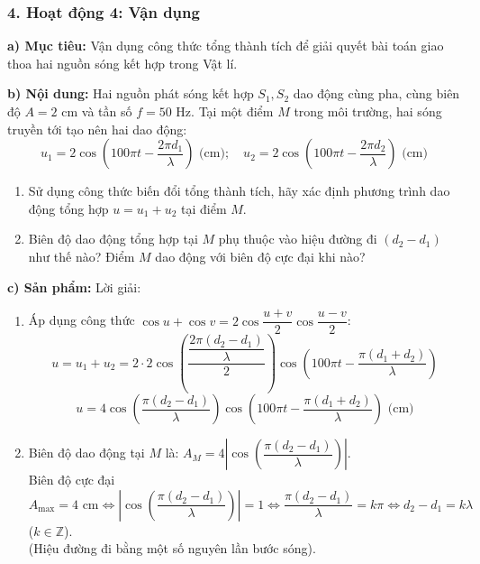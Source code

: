 \documentclass[12pt, a4paper]{article}
\begin{document}
\subsubsection*{4. Hoạt động 4: Vận dụng}
\textbf{a) Mục tiêu:} Vận dụng công thức tổng thành tích để giải quyết bài toán giao thoa hai nguồn sóng kết hợp trong Vật lí.

\textbf{b) Nội dung:}
Hai nguồn phát sóng kết hợp $S_1, S_2$ dao động cùng pha, cùng biên độ $A = 2\text{ cm}$ và tần số $f = 50\text{ Hz}$. Tại một điểm $M$ trong môi trường, hai sóng truyền tới tạo nên hai dao động:
$$u_1 = 2\cos\left(100\pi t - \dfrac{2\pi d_1}{\lambda}\right) \text{ (cm)}; \quad u_2 = 2\cos\left(100\pi t - \dfrac{2\pi d_2}{\lambda}\right) \text{ (cm)}$$
\begin{enumerate}[leftmargin=0.5cm]
    \item Sử dụng công thức biến đổi tổng thành tích, hãy xác định phương trình dao động tổng hợp $u = u_1 + u_2$ tại điểm $M$.
    \item Biên độ dao động tổng hợp tại $M$ phụ thuộc vào hiệu đường đi $(d_2 - d_1)$ như thế nào? Điểm $M$ dao động với biên độ cực đại khi nào?
\end{enumerate}

\textbf{c) Sản phẩm:} Lời giải:
\begin{enumerate}[leftmargin=0.5cm]
    \item Áp dụng công thức $\cos u + \cos v = 2\cos\dfrac{u + v}{2} \cos\dfrac{u - v}{2}$:
    $$u = u_1 + u_2 = 2 \cdot 2 \cos\left(\dfrac{\dfrac{2\pi(d_2 - d_1)}{\lambda}}{2}\right) \cos\left(100\pi t - \dfrac{\pi(d_1 + d_2)}{\lambda}\right)$$
    $$u = 4\cos\left(\dfrac{\pi(d_2 - d_1)}{\lambda}\right) \cos\left(100\pi t - \dfrac{\pi(d_1 + d_2)}{\lambda}\right) \text{ (cm)}$$
    \item Biên độ dao động tại $M$ là: $A_M = 4 \left|\cos\left(\dfrac{\pi(d_2 - d_1)}{\lambda}\right)\right|$.\\
    Biên độ cực đại $A_{\max} = 4\text{ cm} \iff \left|\cos\left(\dfrac{\pi(d_2 - d_1)}{\lambda}\right)\right| = 1 \iff \dfrac{\pi(d_2 - d_1)}{\lambda} = k\pi \iff d_2 - d_1 = k\lambda$ ($k \in \mathbb{Z}$).\\
    (Hiệu đường đi bằng một số nguyên lần bước sóng).
\end{enumerate}
\end{document}
